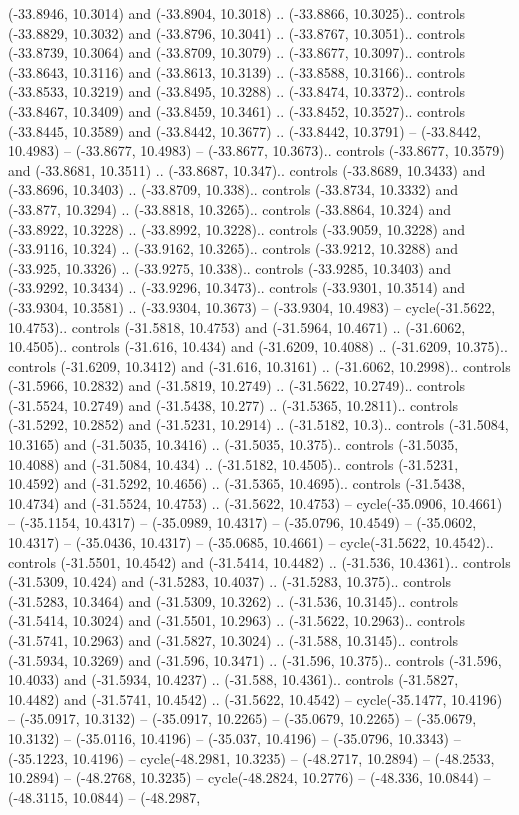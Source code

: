 \begin{scope}[shift={(2.5552, 9.9912)}]
\begin{scope}[shift={(48.1654, -14.8546)}]
(-33.8946, 10.3014) and (-33.8904, 10.3018) .. (-33.8866, 10.3025).. controls (-33.8829, 10.3032) and (-33.8796, 10.3041) .. (-33.8767, 10.3051).. controls (-33.8739, 10.3064) and (-33.8709, 10.3079) .. (-33.8677, 10.3097).. controls (-33.8643, 10.3116) and (-33.8613, 10.3139) .. (-33.8588, 10.3166).. controls (-33.8533, 10.3219) and (-33.8495, 10.3288) .. (-33.8474, 10.3372).. controls (-33.8467, 10.3409) and (-33.8459, 10.3461) .. (-33.8452, 10.3527).. controls (-33.8445, 10.3589) and (-33.8442, 10.3677) .. (-33.8442, 10.3791) -- (-33.8442, 10.4983) -- (-33.8677, 10.4983) -- (-33.8677, 10.3673).. controls (-33.8677, 10.3579) and (-33.8681, 10.3511) .. (-33.8687, 10.347).. controls (-33.8689, 10.3433) and (-33.8696, 10.3403) .. (-33.8709, 10.338).. controls (-33.8734, 10.3332) and (-33.877, 10.3294) .. (-33.8818, 10.3265).. controls (-33.8864, 10.324) and (-33.8922, 10.3228) .. (-33.8992, 10.3228).. controls (-33.9059, 10.3228) and (-33.9116, 10.324) .. (-33.9162, 10.3265).. controls (-33.9212, 10.3288) and (-33.925, 10.3326) .. (-33.9275, 10.338).. controls (-33.9285, 10.3403) and (-33.9292, 10.3434) .. (-33.9296, 10.3473).. controls (-33.9301, 10.3514) and (-33.9304, 10.3581) .. (-33.9304, 10.3673) -- (-33.9304, 10.4983) -- cycle(-31.5622, 10.4753).. controls (-31.5818, 10.4753) and (-31.5964, 10.4671) .. (-31.6062, 10.4505).. controls (-31.616, 10.434) and (-31.6209, 10.4088) .. (-31.6209, 10.375).. controls (-31.6209, 10.3412) and (-31.616, 10.3161) .. (-31.6062, 10.2998).. controls (-31.5966, 10.2832) and (-31.5819, 10.2749) .. (-31.5622, 10.2749).. controls (-31.5524, 10.2749) and (-31.5438, 10.277) .. (-31.5365, 10.2811).. controls (-31.5292, 10.2852) and (-31.5231, 10.2914) .. (-31.5182, 10.3).. controls (-31.5084, 10.3165) and (-31.5035, 10.3416) .. (-31.5035, 10.375).. controls (-31.5035, 10.4088) and (-31.5084, 10.434) .. (-31.5182, 10.4505).. controls (-31.5231, 10.4592) and (-31.5292, 10.4656) .. (-31.5365, 10.4695).. controls (-31.5438, 10.4734) and (-31.5524, 10.4753) .. (-31.5622, 10.4753) -- cycle(-35.0906, 10.4661) -- (-35.1154, 10.4317) -- (-35.0989, 10.4317) -- (-35.0796, 10.4549) -- (-35.0602, 10.4317) -- (-35.0436, 10.4317) -- (-35.0685, 10.4661) -- cycle(-31.5622, 10.4542).. controls (-31.5501, 10.4542) and (-31.5414, 10.4482) .. (-31.536, 10.4361).. controls (-31.5309, 10.424) and (-31.5283, 10.4037) .. (-31.5283, 10.375).. controls (-31.5283, 10.3464) and (-31.5309, 10.3262) .. (-31.536, 10.3145).. controls (-31.5414, 10.3024) and (-31.5501, 10.2963) .. (-31.5622, 10.2963).. controls (-31.5741, 10.2963) and (-31.5827, 10.3024) .. (-31.588, 10.3145).. controls (-31.5934, 10.3269) and (-31.596, 10.3471) .. (-31.596, 10.375).. controls (-31.596, 10.4033) and (-31.5934, 10.4237) .. (-31.588, 10.4361).. controls (-31.5827, 10.4482) and (-31.5741, 10.4542) .. (-31.5622, 10.4542) -- cycle(-35.1477, 10.4196) -- (-35.0917, 10.3132) -- (-35.0917, 10.2265) -- (-35.0679, 10.2265) -- (-35.0679, 10.3132) -- (-35.0116, 10.4196) -- (-35.037, 10.4196) -- (-35.0796, 10.3343) -- (-35.1223, 10.4196) -- cycle(-48.2981, 10.3235) -- (-48.2717, 10.2894) -- (-48.2533, 10.2894) -- (-48.2768, 10.3235) -- cycle(-48.2824, 10.2776) -- (-48.336, 10.0844) -- (-48.3115, 10.0844) -- (-48.2987, 
\end{scope}
\end{scope}
